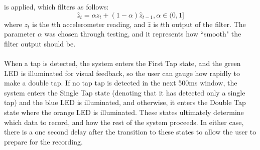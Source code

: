 is applied, which filters as follows:
\begin{equation}
	\hat{z}_{t} = \alpha z_{t} + (1-\alpha)\hat{z}_{t-1}, \alpha\in(0,1]
\end{equation}
where $z_t$ is the $t$th accelerometer reading, and $\hat{z}$ is $t$th output of the filter. The
parameter $\alpha$ was chosen through testing, and it represents how ``smooth" the filter output
should be.\\\\
When a tap is detected, the system enters the First Tap state, and the green LED is illuminated for
visual feedback, so the user can gauge how rapidly to make a double tap. If no tap tap is detected
in the next 500ms window, the system enters the Single Tap state (denoting that it has detected only
a single tap) and the blue LED is illuminated, and otherwise, it enters the Double Tap state where
the orange LED is illuminated. These states ultimately determine
which data to record, and how the rest of the system proceeds. In either case, there is a one second
delay after the transition to these states to allow the user to prepare for the recording.
